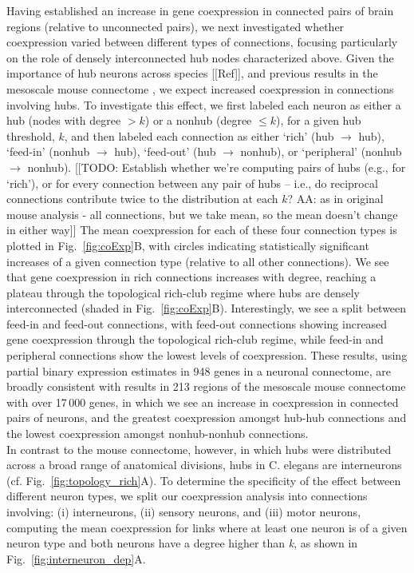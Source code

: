 \documentclass[10pt,letterpaper]{article}
\begin{document}
Having established an increase in gene coexpression in connected pairs of brain regions (relative to unconnected pairs), we next investigated whether coexpression varied between different types of connections, focusing particularly on the role of densely interconnected hub nodes characterized above.
Given the importance of hub neurons across species [[Ref]], and previous results in the mesoscale mouse connectome \cite{Fulcher:2016ck}, we expect increased coexpression in connections involving hubs.
To investigate this effect, we first labeled each neuron as either a hub (nodes with degree $> k$) or a nonhub (degree $\leq k$), for a given hub threshold, $k$, and then labeled each connection as either `rich' (hub $\rightarrow$ hub), `feed-in' (nonhub $\rightarrow$ hub), `feed-out' (hub $\rightarrow$ nonhub), or `peripheral' (nonhub $\rightarrow$ nonhub).
[[TODO: Establish whether we're computing pairs of hubs (e.g., for `rich'), or for every connection between any pair of hubs -- i.e., do reciprocal connections contribute twice to the distribution at each $k$? AA: as in original mouse analysis - all connections, but we take mean, so the mean doesn't change in either way]]
The mean coexpression for each of these four connection types is plotted in Fig.~\ref{fig:coExp}B, with circles indicating statistically significant increases of a given connection type (relative to all other connections). 
We see that gene coexpression in rich connections increases with degree, reaching a plateau through the topological rich-club regime where hubs are densely interconnected (shaded in Fig.~\ref{fig:coExp}B).
Interestingly, we see a split between feed-in and feed-out connections, with feed-out connections showing increased gene coexpression through the topological rich-club regime, while feed-in and peripheral connections show the lowest levels of coexpression.
These results, using partial binary expression estimates in 948 genes in a neuronal connectome, are broadly consistent with results in 213 regions of the mesoscale mouse connectome with over 17\,000 genes, in which we see an increase in coexpression in connected pairs of neurons, and the greatest coexpression amongst hub-hub connections and the lowest coexpression amongst nonhub-nonhub connections.\\
In contrast to the mouse connectome, however, in which hubs were distributed across a broad range of anatomical divisions, hubs in C. elegans are interneurons \cite{Towlson:2013gf} (cf. Fig.~\ref{fig:topology_rich}A).
To determine the specificity of the effect between different neuron types, we split our coexpression analysis into connections involving: (i) interneurons, (ii) sensory neurons, and (iii) motor neurons, computing the mean coexpression for links where at least one neuron is of a given neuron type and both neurons have a degree higher than \textit{k}, as shown in Fig.~\ref{fig:interneuron_dep}A.
\end{document}
